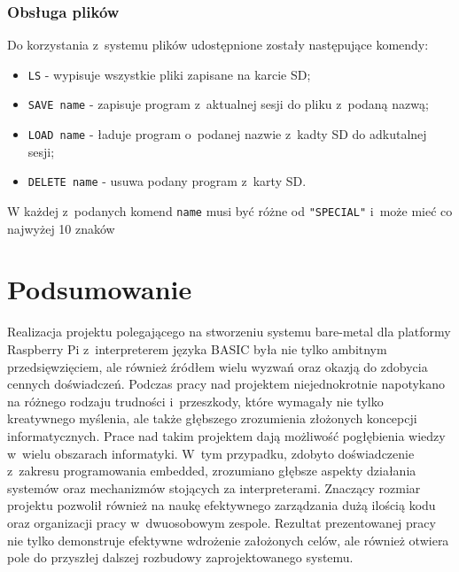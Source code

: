 \documentclass[shortabstract]{iithesis}
\begin{document}
\subsection{Obsługa plików}
Do korzystania z~systemu plików udostępnione zostały następujące komendy:
\begin{itemize}
 \item \texttt{LS} - wypisuje wszystkie pliki zapisane na karcie SD;
 \item \texttt{SAVE name} - zapisuje program z~aktualnej sesji do pliku z~podaną nazwą;
 \item \texttt{LOAD name} - ładuje program o~podanej nazwie z~kadty SD do adkutalnej sesji;
 \item \texttt{DELETE name} - usuwa podany program z~karty SD.
\end{itemize}
W każdej z~podanych komend \texttt{name} musi być różne od \texttt{"SPECIAL"} i~może mieć co najwyżej 10 znaków

\chapter*{Podsumowanie}
Realizacja projektu polegającego na stworzeniu systemu bare-metal dla platformy Raspberry Pi z~interpreterem języka BASIC była nie tylko ambitnym przedsięwzięciem, ale również źródłem wielu wyzwań oraz okazją do zdobycia cennych doświadczeń. Podczas pracy nad projektem niejednokrotnie napotykano na różnego rodzaju trudności i~przeszkody, które wymagały nie tylko kreatywnego myślenia, ale także głębszego zrozumienia złożonych koncepcji informatycznych.
Prace nad takim projektem dają możliwość pogłębienia wiedzy w~wielu obszarach informatyki. W~tym przypadku, zdobyto doświadczenie z~zakresu programowania embedded, zrozumiano głębsze aspekty działania systemów oraz mechanizmów stojących za interpreterami. Znaczący rozmiar projektu pozwolił również na naukę efektywnego zarządzania dużą ilością kodu oraz organizacji pracy w~dwuosobowym zespole.
Rezultat prezentowanej pracy nie tylko demonstruje efektywne wdrożenie założonych celów, ale również otwiera pole do przyszłej dalszej rozbudowy zaprojektowanego systemu. 
\end{document}
